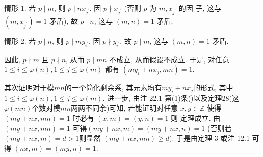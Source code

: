\documentclass[a4paper,12pt]{ctexart}
\begin{document}
  情形 1. 若 $p \mid m$, 则 $p \mid n x_{j^{\prime}}$. 因 $p \nmid x_{j^{\prime}}$ (否则 $p$ 为 $m, x_{j^{\prime}}$ 的因 子, 这与 $\left(m, x_{j^{\prime}}\right)=1$ 矛盾), 故 $p \mid n$, 这与 $(m, n)=1$ 矛盾;

  情形 2. 若 $p \mid n$, 则 $p \mid m y_{i^{\prime}}$. 因 $p \nmid y_{i^{\prime}}$, 故 $p \mid m$, 这与 $(m, n)=1$ 矛盾.

  因此, $p \nmid m$ 且 $p \nmid n$, 从而 $p \mid m n$ 不成立, 从而假设不成立. 于是, 对任意 $1 \leq i \leq \varphi(n), 1 \leq j \leq \varphi(m)$ 都有 $\left(m y_i+n x_j, m n\right)=1$. 

  其次证明对于模$mn$的一个简化剩余系, 其元素均有$my_i+nx_j$的形式, 其中$1\le i\le \varphi(n),1\le j\le\varphi(m)$.
  进一步, 由注 22.1 第(1)条()以及定理28(这$\varphi(mn)$个数对模$mn$两两不同余)可知, 若能证明对任意 $x, y \in \mathbb{Z}$ 使得 $(m y+n x, m n)=1$ 时必有 $(x, m)=(y, n)=1$ 则 定理成立. 由 $(m y+n x, m n)=1$ 可得$(m y+n x, m)=(m y+n x, n)=1$ (否则若$(m y+n x, m)=d>1$则显然 $(m y+n x, m n) \geq d)$. 于是由定理 3 或注 12.1 可得 $(n x, m)=(m y, n)=1$.
\end{document}

